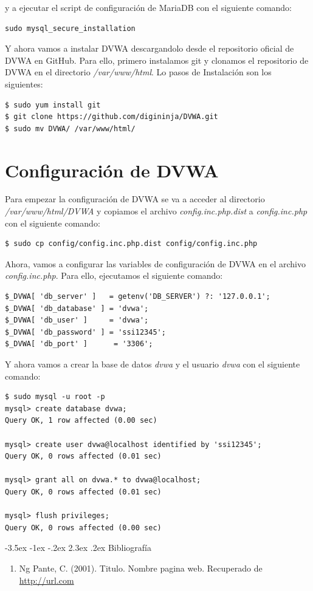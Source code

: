 \documentclass[11pt]{report}
\makeatletter
\renewcommand\chapter{\@startsection{chapter}{0}{\z@}%
    {-3.5ex \@plus -1ex \@minus -.2ex}%
    {2.3ex \@plus.2ex}%
    {\normalfont\Large\bfseries}}
\makeatother
\begin{document}
y a ejecutar el script de configuración de MariaDB con el siguiente comando:
\begin{BVerbatim}
sudo mysql_secure_installation
\end{BVerbatim}

Y ahora vamos a instalar DVWA descargandolo desde el repositorio oficial de DVWA en GitHub. Para ello, primero instalamos git y clonamos el repositorio de DVWA en el directorio
\emph{/var/www/html}. Lo pasos de Instalación son los siguientes:
\begin{verbatim}
$ sudo yum install git
$ git clone https://github.com/digininja/DVWA.git
$ sudo mv DVWA/ /var/www/html/
\end{verbatim}

\section{Configuración de DVWA}
Para empezar la configuración de DVWA se va a acceder al directorio \emph{/var/www/html/DVWA} y copiamos el archivo \emph{config.inc.php.dist} a
\emph{config.inc.php} con el siguiente comando:
\begin{verbatim}
$ sudo cp config/config.inc.php.dist config/config.inc.php
\end{verbatim}

Ahora, vamos a configurar las variables de configuración de DVWA en el archivo \emph{config.inc.php}. Para ello, ejecutamos el siguiente comando:
\begin{verbatim}
$_DVWA[ 'db_server' ]   = getenv('DB_SERVER') ?: '127.0.0.1';
$_DVWA[ 'db_database' ] = 'dvwa';
$_DVWA[ 'db_user' ]     = 'dvwa';
$_DVWA[ 'db_password' ] = 'ssi12345';
$_DVWA[ 'db_port' ]      = '3306';
\end{verbatim}

Y ahora vamos a crear la base de datos \emph{dvwa} y el usuario \emph{dvwa} con el siguiente comando:
\begin{verbatim}
$ sudo mysql -u root -p
mysql> create database dvwa;
Query OK, 1 row affected (0.00 sec)

mysql> create user dvwa@localhost identified by 'ssi12345';
Query OK, 0 rows affected (0.01 sec)

mysql> grant all on dvwa.* to dvwa@localhost;
Query OK, 0 rows affected (0.01 sec)

mysql> flush privileges;
Query OK, 0 rows affected (0.00 sec)
\end{verbatim}



\chapter{Bibliografía} %
\begin{enumerate}
\item Ng Pante, C. (2001). Titulo. Nombre pagina web. Recuperado de \url{http://url.com}

\end{enumerate}
\end{document}
